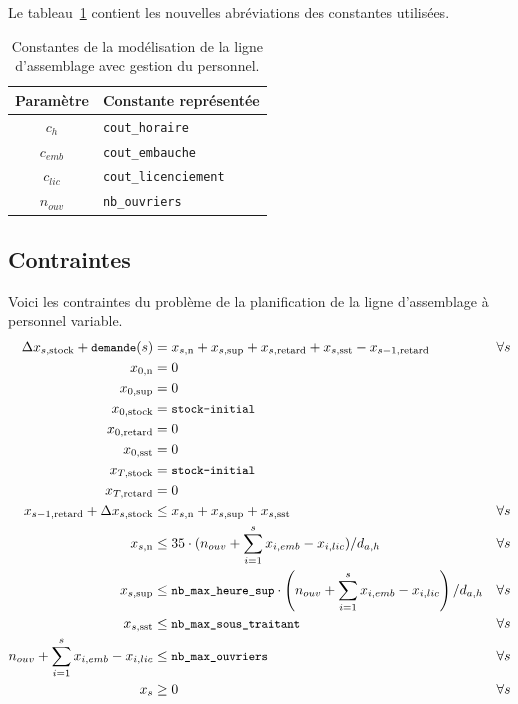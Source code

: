 \documentclass[12pt,oneside,a4paper]{article}
\newcommand{\myX}[2]{x_{#1,\text{#2}}}
\newcommand{\xSemaine}[1]{\myX{s}{#1}}
\newcommand{\xn}{\xSemaine{n}}
\newcommand{\xsup}{\xSemaine{sup}}
\newcommand{\xstock}{\xSemaine{stock}}
\newcommand{\xretard}{\xSemaine{retard}}
\newcommand{\xsst}{\xSemaine{sst}}
\newcommand{\texttts}[1]{{\small\texttt{#1}}}
\begin{document}
Le tableau~\ref{tab:constantesQuestion7} contient les nouvelles abréviations
des constantes utilisées.
\begin{table}[h]
  \begin{center}
  \begin{tabular}{|c|l|}
    \hline
    Paramètre & Constante représentée \\
    \hline
    \hline
    $c_{h}$ & \texttt{cout\_horaire} \\
    \hline
    $c_{emb}$ & \texttt{cout\_embauche} \\
    \hline
    $c_{lic}$ & \texttt{cout\_licenciement} \\
    \hline
    $n_{ouv}$ & \texttt{nb\_ouvriers} \\
    \hline
  \end{tabular}
  \caption{Constantes de la modélisation de la ligne d'assemblage
  avec gestion du personnel.}
  \label{tab:constantesQuestion7}
  \end{center}
\end{table}

\subsection*{Contraintes}
Voici les contraintes du problème de la planification 
de la ligne d’assemblage à personnel variable.
\begin{align*}
  \Delta\xstock + \texttts{demande}(s) &= \xn + \xsup 
  + \xretard + \xsst - \myX{s-1}{retard} &\forall s \\
  \myX{0}{n}&= 0 \\
  \myX{0}{sup}&= 0 \\
  \myX{0}{stock} &= \texttts{stock-initial} \\
  \myX{0}{retard}&= 0 \\
  \myX{0}{sst}&= 0 \\
  \myX{T}{stock} &= \texttts{stock-initial} \\
  \myX{T}{retard}&= 0 \\
  \myX{s-1}{retard} + \Delta\xstock &\leq \xn + \xsup + \xsst &\forall s \\
  \xn &\leq 35\cdot (n_{ouv} + \sum_{i=1}^{s} x_{i,emb} - x_{i,lic})/ d_{a,h}
  &\forall s \\
  \xsup &\leq \texttts{nb\_max\_heure\_sup}\cdot \left(n_{ouv} + \sum_{i=1}^{s} x_{i,emb} - x_{i,lic} \right)/ d_{a,h}
  &\forall s \\
  \xsst &\leq \texttts{nb\_max\_sous\_traitant} &\forall s \\
  n_{ouv} + \sum_{i=1}^{s} x_{i,emb} - x_{i,lic} &\leq \texttts{nb\_max\_ouvriers}  &\forall s \\
  x_s &\geq 0 &\forall s
\end{align*}

\appendix

\end{document}
